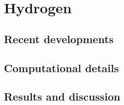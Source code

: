 \chapter{Hydrogen}
\section{Recent developments}
\section{Computational details}
\section{Results and discussion}
